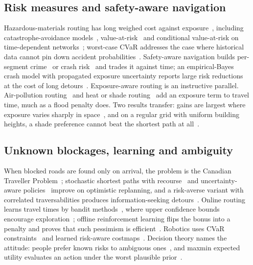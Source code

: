 \documentclass[journal]{IEEEtran}
\begin{document}
\subsection{Risk measures and safety-aware navigation}
Hazardous-materials routing has long weighed cost against exposure~\cite{erkut1998hazmat}, including catastrophe-avoidance models~\cite{erkut2000catastrophe}, value-at-risk~\cite{kang2014var} and conditional value-at-risk on time-dependent networks~\cite{toumazis2013cvar}; worst-case CVaR addresses the case where historical data cannot pin down accident probabilities~\cite{toumazis2016wcvar}. Safety-aware navigation builds per-segment crime~\cite{galbrun2016safe} or crash risk~\cite{krumm2017riskaware,li2016roadrisk,ghoul2023safest} and trades it against time; an empirical-Bayes crash model with propagated exposure uncertainty reports large risk reductions at the cost of long detours~\cite{rohmann2026bayesian}. Exposure-aware routing is an instructive parallel. Air-pollution routing~\cite{sharker2014ape,mahajan2019car,zou2020healthier,wang2022activetravel,choudhary2022multimodal} and heat or shade routing~\cite{kolaxidis2025heat,wolf2025coolwalks,melnikov2022thermal} add an exposure term to travel time, much as a flood penalty does. Two results transfer: gains are largest where exposure varies sharply in space~\cite{zou2020healthier}, and on a regular grid with uniform building heights, a shade preference cannot beat the shortest path at all~\cite{wolf2025coolwalks}.

\subsection{Unknown blockages, learning and ambiguity}
When blocked roads are found only on arrival, the problem is the Canadian Traveller Problem~\cite{papadimitriou1991ctp}; stochastic shortest paths with recourse~\cite{polychronopoulos1996recourse} and uncertainty-aware policies~\cite{eyerich2010ctp} improve on optimistic replanning, and a risk-averse variant with correlated traversabilities produces information-seeking detours~\cite{lamarre2026riskctp}. Online routing learns travel times by bandit methods~\cite{talebi2018online,lagos2024online}, where upper confidence bounds encourage exploration~\cite{auer2002ucb}; offline reinforcement learning flips the bonus into a penalty and proves that such pessimism is efficient~\cite{jin2025pessimism}. Robotics uses CVaR constraints~\cite{hakobyan2019cvar} and learned risk-aware costmaps~\cite{fan2022costmaps}. Decision theory names the attitude: people prefer known risks to ambiguous ones~\cite{ellsberg1961risk}, and maxmin expected utility evaluates an action under the worst plausible prior~\cite{gilboa1989maxmin}.
\end{document}
